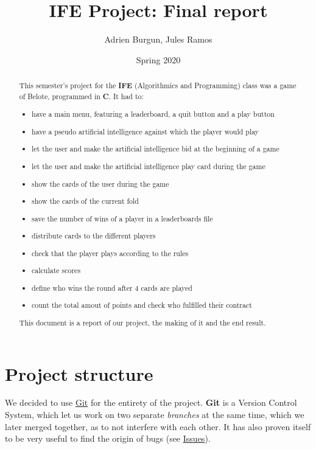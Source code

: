 \documentclass[12pt]{article}
\title{IFE Project: Final report}
\author{Adrien Burgun, Jules Ramos}
\date{Spring 2020}
\begin{document}
\maketitle

\begin{abstract}

This semester's project for the \textbf{IFE} (Algorithmics and Programming) class was a game of Belote, programmed in \textbf{C}.
It had to:

\begin{itemize}
\item have a main menu, featuring a leaderboard, a quit button and a play button
\item have a pseudo artificial intelligence against which the player would play
\item let the user and make the artificial intelligence bid at the beginning of a game
\item let the user and make the artificial intelligence play card during the game
\item show the cards of the user during the game
\item show the cards of the current fold
\item save the number of wins of a player in a leaderboards file
\item distribute cards to the different players
\item check that the player plays according to the rules
\item calculate scores
\item define who wins the round after 4 cards are played
\item count the total amout of points and check who fulfilled their contract
\end{itemize}

This document is a report of our project, the making of it and the end result.

\end{abstract}

\newpage
\tableofcontents
\newpage

\section{Project structure}

We decided to use \href{https://git-scm.com/}{Git} for the entirety of the project.
\textbf{Git} is a Version Control System, which let us work on two separate \textit{branches} at the same time, which we later merged together, as to not interfere with each other.
It has also proven itself to be very useful to find the origin of bugs (see \hyperref[issues]{Issues}).
\end{document}
